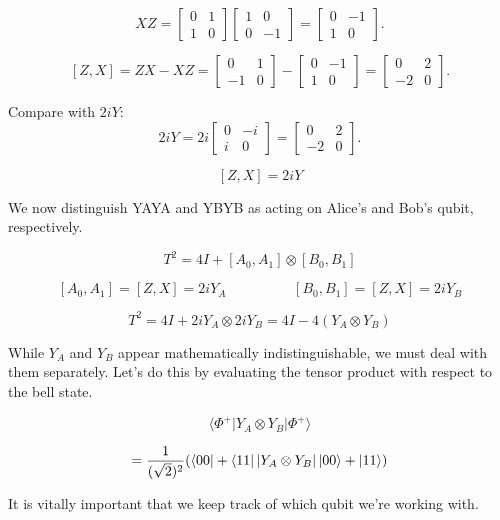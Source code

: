 \documentclass[12pt]{article}
\begin{document}
$$  
XZ = \begin{bmatrix} 0 & 1 \\ 1 & 0 \end{bmatrix} \begin{bmatrix} 1 & 0 \\ 0 & -1 \end{bmatrix} = \begin{bmatrix} 0 & -1 \\ 1 & 0 \end{bmatrix}.  
$$  

$$  
[Z, X] = ZX - XZ = \begin{bmatrix} 0 & 1 \\ -1 & 0 \end{bmatrix} - \begin{bmatrix} 0 & -1 \\ 1 & 0 \end{bmatrix} = \begin{bmatrix} 0 & 2 \\ -2 & 0 \end{bmatrix}.  
$$  

Compare with $2iY$:  
$$  
2iY = 2i \begin{bmatrix} 0 & -i \\ i & 0 \end{bmatrix} = \begin{bmatrix} 0 & 2 \\ -2 & 0 \end{bmatrix}.  
$$  

$$
[Z,X] = 2iY
$$

We now distinguish YAYA​ and YBYB​ as acting on Alice’s and Bob’s qubit, respectively.

\[
T^2 = 4I + [A_0, A_1] \otimes [B_0, B_1] 
\]

$$
[A_0, A_1] = [Z,X] = 2iY_A \hspace{2cm} [B_0, B_1] = [Z,X] = 2iY_B
$$

\[
T^2 = 4I + 2iY_A \otimes 2iY_B = 4I - 4(Y_A \otimes Y_B)
\]

While $Y_A$ and $Y_B$ appear mathematically indistinguishable, we must deal with them separately. Let's do this by evaluating the tensor product with respect to the bell state.

\[
\langle \Phi^+ | Y_A \otimes Y_B | \Phi^+ \rangle
\]


\[
= \frac{1}{(\sqrt{2})^2}( \bra{00} + \bra{11} | Y_A \otimes Y_B | \ket{00} + \ket{11} )
\]

It is vitally important that we keep track of which qubit we're working with.
\end{document}
